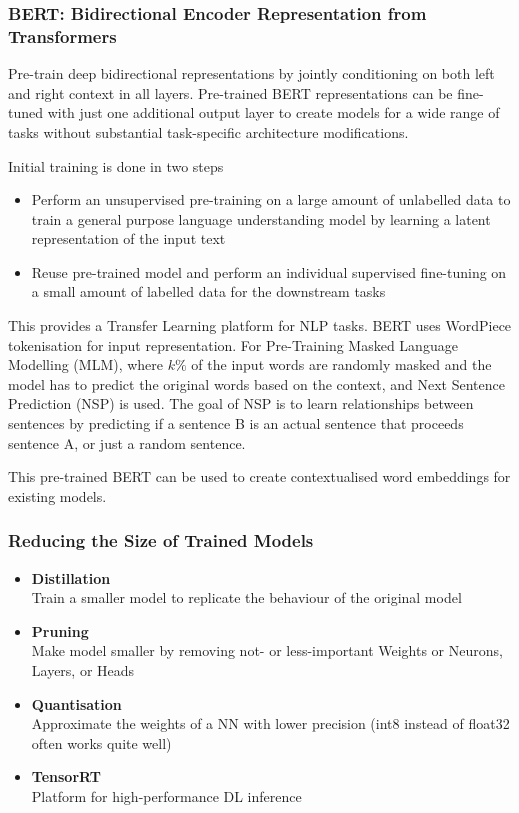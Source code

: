 \documentclass[11pt]{article}
\begin{document}
\subsubsection{BERT: Bidirectional Encoder Representation from Transformers}
Pre-train deep bidirectional representations by jointly conditioning on both left and right context in all layers. Pre-trained BERT representations can be fine-tuned with just one additional output layer to create models for a wide range of tasks without substantial task-specific architecture modifications.

Initial training is done in two steps
\begin{itemize}
	\item Perform an unsupervised pre-training on a large amount of unlabelled data to train a general purpose language understanding model by learning a latent representation of the input text
	\item Reuse pre-trained model and perform an individual supervised fine-tuning on a small amount of labelled data for the downstream tasks
\end{itemize}
This provides a Transfer Learning platform for NLP tasks. BERT uses WordPiece tokenisation for input representation. For Pre-Training Masked Language Modelling (MLM), where $k\%$ of the input words are randomly masked and the model has to predict the original words based on the context, and Next Sentence Prediction (NSP) is used. The goal of NSP is to learn relationships between sentences by predicting if a sentence B is an actual sentence that proceeds sentence A, or just a random sentence.

This pre-trained BERT can be used to create contextualised word embeddings for existing models.

\subsubsection{Reducing the Size of Trained Models}
\begin{itemize}
	\item \textbf{Distillation}\\
	Train a smaller model to replicate the behaviour of the original model
	\item \textbf{Pruning}\\
	Make model smaller by removing not- or less-important Weights or Neurons, Layers, or Heads
	\item \textbf{Quantisation}\\
	Approximate the weights of a NN with lower precision (int8 instead of float32 often works quite well)
	\item \textbf{TensorRT}\\
	Platform for high-performance DL inference
\end{itemize}
\end{document}

